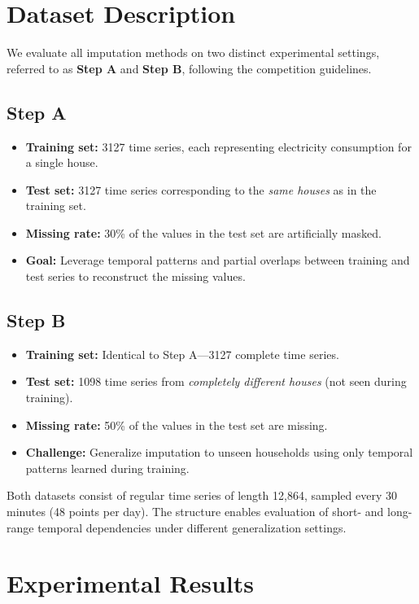 \documentclass[10pt,twocolumn]{article}
\begin{document}
	
	
	\section{Dataset Description}
	We evaluate all imputation methods on two distinct experimental settings, referred to as \textbf{Step A} and \textbf{Step B}, following the competition guidelines.
	
	\subsection*{Step A}
	\begin{itemize}
		\item \textbf{Training set:} 3127 time series, each representing electricity consumption for a single house.
		\item \textbf{Test set:} 3127 time series corresponding to the \textit{same houses} as in the training set.
		\item \textbf{Missing rate:} 30\% of the values in the test set are artificially masked.
		\item \textbf{Goal:} Leverage temporal patterns and partial overlaps between training and test series to reconstruct the missing values.
	\end{itemize}
	
	\subsection*{Step B}
	\begin{itemize}
		\item \textbf{Training set:} Identical to Step A—3127 complete time series.
		\item \textbf{Test set:} 1098 time series from \textit{completely different houses} (not seen during training).
		\item \textbf{Missing rate:} 50\% of the values in the test set are missing.
		\item \textbf{Challenge:} Generalize imputation to unseen households using only temporal patterns learned during training.
	\end{itemize}
	
	Both datasets consist of regular time series of length 12,864, sampled every 30 minutes (48 points per day). The structure enables evaluation of short- and long-range temporal dependencies under different generalization settings.
	
	
	\section{Experimental Results}
\end{document}
